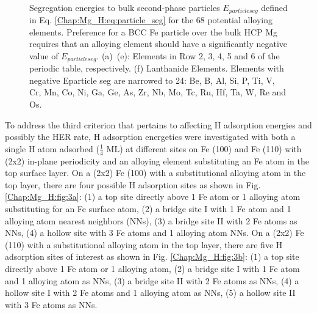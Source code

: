 \begin{figure}[!ht]
  \\
  \label{Chap:Mg_H:fig:5e}
  \label{Chap:Mg_H:fig:5f}
\caption[Segregation energies to bulk second-phase particles]{Segregation energies to bulk second-phase particles $E_{particle seg}$ defined in Eq. \ref{Chap:Mg_H:eq:particle_seg} for the 68 potential alloying elements. Preference for a \ac{BCC} Fe particle over the bulk \ac{HCP} Mg requires that an alloying element should have a significantly negative value of $E_{particle seg}$. (a)~(e): Elements in Row 2, 3, 4, 5 and 6 of the periodic table, respectively. (f) Lanthanide Elements. Elements with negative Eparticle seg are narrowed to 24: Be, B, Al, Si, P, Ti, V, Cr, Mn, Co, Ni, Ga, Ge, As, Zr, Nb, Mo, Tc, Ru, Hf, Ta, W, Re and Os.}
  \label{Chap:Mg_H:fig5}
\end{figure}
\endgroup

To address the third criterion that pertains to affecting H adsorption energies and possibly the HER rate, H adsorption energetics were investigated with both a single H atom adsorbed ($\frac{1}{4}$ \ac{ML}) at different sites on Fe (100) and Fe (110) with (2x2) in-plane periodicity and an alloying element substituting an Fe atom in the top surface layer. On a (2x2) Fe (100) with a substitutional alloying atom in the top layer, there are four possible H adsorption sites as shown in Fig. \ref{Chap:Mg_H:fig:3a}: (1) a top site directly above 1 Fe atom or 1 alloying atom substituting for an Fe surface atom, (2) a bridge site I with 1 Fe atom and 1 alloying atom nearest neighbors (NNs), (3) a bridge site II with 2 Fe atoms as NNs, (4) a hollow site with 3 Fe atoms and 1 alloying atom NNs. On a (2x2) Fe (110) with a substitutional alloying atom in the top layer, there are five H adsorption sites of interest as shown in Fig. \ref{Chap:Mg_H:fig:3b}: (1) a top site directly above 1 Fe atom or 1 alloying atom, (2) a bridge site I with 1 Fe atom and 1 alloying atom as NNs, (3) a bridge site II with 2 Fe atoms as NNs, (4) a hollow site I with 2 Fe atoms and 1 alloying atom as NNs, (5) a hollow site II with 3 Fe atoms as NNs.


